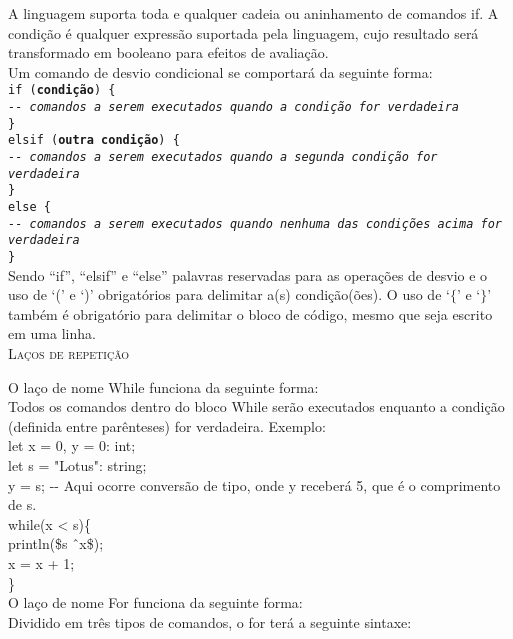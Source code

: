 \documentclass[12pt,a4paper]{article}
\def\emph#1{\textbf{#1}} %
\begin{document}
A linguagem suporta toda e qualquer cadeia ou aninhamento de comandos if. A condição é qualquer expressão suportada pela linguagem, cujo resultado será transformado em booleano para efeitos de avaliação.\\

Um comando de desvio condicional se comportará da seguinte forma: \\

\noindent\texttt{if (\emph{condição}) \{\\
\indent\textit{-{}- comandos a serem executados quando a condição for verdadeira} \\
\} \\
elsif (\emph{outra condição}) \{\\
\indent\textit{-{}- comandos a serem executados quando a segunda condição for verdadeira} \\
\} \\
else \{\\
\indent\textit{-{}- comandos a serem executados quando nenhuma das condições acima for verdadeira} \\
\}}\\

Sendo ``if'', ``elsif'' e ``else'' palavras reservadas para as operações de desvio e o uso de `(' e `)' obrigatórios para delimitar a(s) condição(ões). O uso de `$\{$' e `$\}$' também é obrigatório para delimitar o bloco de código, mesmo que seja escrito em uma linha.\\


\hypertarget{label5}{\Large{\textsc{Laços de repetição}}}\\[0.3cm]
\normalsize

O laço de nome While funciona da seguinte forma: \\

Todos os comandos dentro do bloco While serão executados enquanto a condição (definida entre parênteses) for verdadeira. Exemplo: \\

let x = 0, y = 0: int;\\

let s = "Lotus": string;\\

y = s; -{}- Aqui ocorre conversão de tipo, onde y receberá 5, que é o comprimento de s. \\[0.2cm]
while(x < s)\{\\
\indent println(\$s \^\ x\$);\\
\indent x = x + 1;\\
\}\\


O laço de nome For funciona da seguinte forma: \\

Dividido em três tipos de comandos, o for terá a seguinte sintaxe: \\
\end{document}
